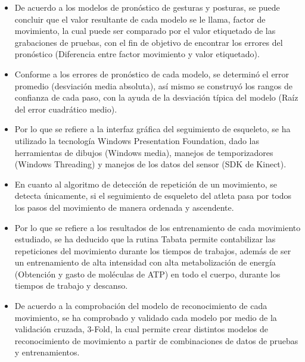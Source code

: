 \begin{itemize}
\item De acuerdo a los modelos de pron\'ostico de gesturas y  posturas, se puede concluir que el valor resultante de cada modelo se le llama, factor de movimiento, la cual puede ser comparado por el valor etiquetado de las grabaciones de pruebas, con el fin de objetivo de encontrar los errores del pron\'ostico (Diferencia entre factor movimiento y valor etiquetado).
\item Conforme a los errores de pron\'ostico de cada modelo, se determin\'o el error promedio (desviaci\'on media absoluta), as\'i mismo se construy\'o los rangos de confianza de cada paso, con la ayuda de la desviaci\'on t\'ipica del modelo (Ra\'iz del error cuadr\'atico medio).
\item Por lo que se refiere a la interfaz gr\'afica del seguimiento de esqueleto, se ha utilizado la tecnolog\'ia Windows Presentation Foundation, dado  las herramientas de dibujos (Windows media), manejos de temporizadores (Windows Threading) y manejos de los datos del sensor (SDK de Kinect).
\item En cuanto al algoritmo de detecci\'on de repetici\'on de un movimiento, se detecta \'unicamente, si el seguimiento de esqueleto del atleta pasa por todos los pasos del movimiento de manera ordenada y ascendente.
\item Por lo que se refiere a los resultados de los entrenamiento de cada movimiento estudiado, se ha deducido que la rutina Tabata permite contabilizar las repeticiones del movimiento durante los tiempos de trabajos, adem\'as de ser un entrenamiento de alta intensidad con alta metabolizaci\'on de energ\'ia (Obtenci\'on y gasto de mol\'eculas de ATP) en todo el cuerpo, durante los tiempos de trabajo y descanso.
\item De acuerdo a la comprobaci\'on del modelo de reconocimiento de cada movimiento, se ha comprobado y validado cada modelo por medio de la validaci\'on  cruzada, 3-Fold, la cual permite crear distintos modelos de reconocimiento de movimiento a partir de  combinaciones de datos de pruebas y entrenamientos.
\end{itemize}